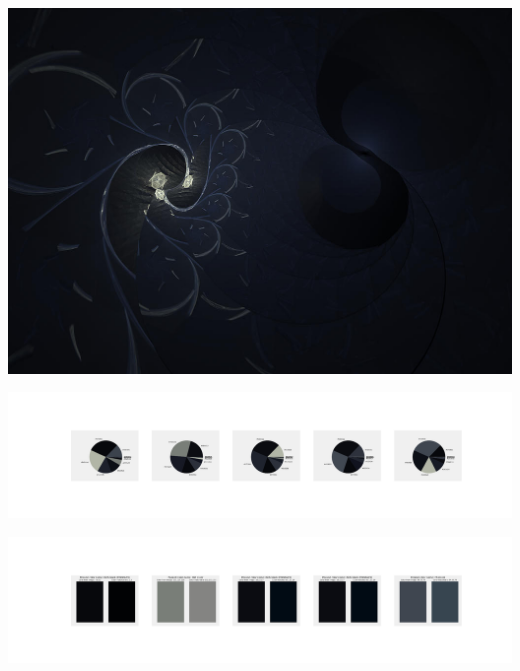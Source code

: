 \documentclass[11pt]{article}
\begin{document}
\begin{landscape}
    \begin{center}
    \includegraphics[width=\textwidth]{./nbimg/file (264).jpg}
    \end{center}

    \begin{center}
    \includegraphics[width=250mm]{./nbimg/pie-183.jpg}
    \end{center}

    \begin{center}
    \includegraphics[width=250mm]{./nbimg/peak-183.jpg}
    \end{center}
    


\end{landscape}
\end{document}
